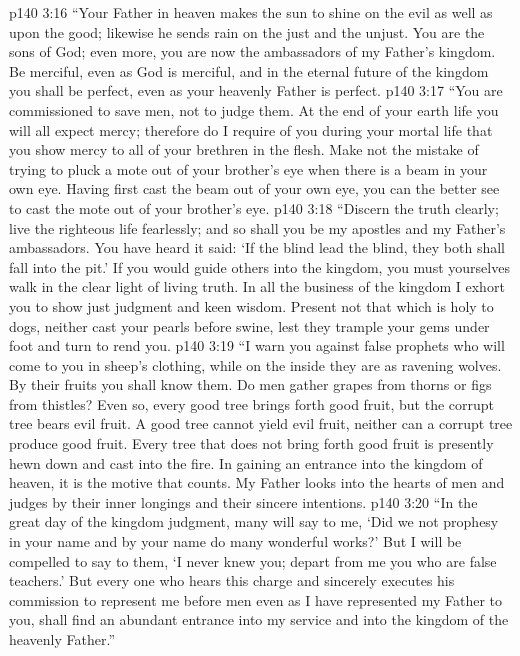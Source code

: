 \vs p140 3:16 \textcolor{ubdarkred}{“Your Father in heaven makes the sun to shine on the evil as well as upon the good; likewise he sends rain on the just and the unjust. You are the sons of God; even more, you are now the ambassadors of my Father’s kingdom. Be merciful, even as God is merciful, and in the eternal future of the kingdom you shall be perfect, even as your heavenly Father is perfect.}
\vs p140 3:17 \textcolor{ubdarkred}{“You are commissioned to save men, not to judge them. At the end of your earth life you will all expect mercy; therefore do I require of you during your mortal life that you show mercy to all of your brethren in the flesh. Make not the mistake of trying to pluck a mote out of your brother’s eye when there is a beam in your own eye. Having first cast the beam out of your own eye, you can the better see to cast the mote out of your brother’s eye.}
\vs p140 3:18 \textcolor{ubdarkred}{“Discern the truth clearly; live the righteous life fearlessly; and so shall you be my apostles and my Father’s ambassadors. You have heard it said: ‘If the blind lead the blind, they both shall fall into the pit.’ If you would guide others into the kingdom, you must yourselves walk in the clear light of living truth. In all the business of the kingdom I exhort you to show just judgment and keen wisdom. Present not that which is holy to dogs, neither cast your pearls before swine, lest they trample your gems under foot and turn to rend you.}\plusone
\vs p140 3:19 \textcolor{ubdarkred}{“I warn you against false prophets who will come to you in sheep’s clothing, while on the inside they are as ravening wolves. By their fruits you shall know them. Do men gather grapes from thorns or figs from thistles? Even so, every good tree brings forth good fruit, but the corrupt tree bears evil fruit. A good tree cannot yield evil fruit, neither can a corrupt tree produce good fruit. Every tree that does not bring forth good fruit is presently hewn down and cast into the fire. In gaining an entrance into the kingdom of heaven, it is the motive that counts. My Father looks into the hearts of men and judges by their inner longings and their sincere intentions.}
\vs p140 3:20 \textcolor{ubdarkred}{“In the great day of the kingdom judgment, many will say to me, ‘Did we not prophesy in your name and by your name do many wonderful works?’ But I will be compelled to say to them, ‘I never knew you; depart from me you who are false teachers.’ But every one who hears this charge and sincerely executes his commission to represent me before men even as I have represented my Father to you, shall find an abundant entrance into my service and into the kingdom of the heavenly Father.”}
